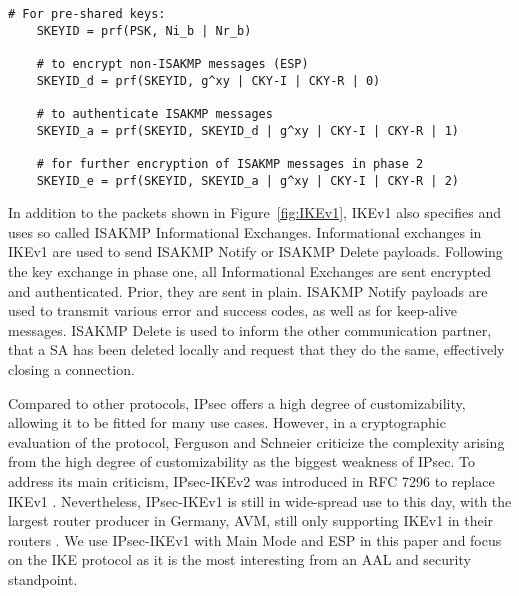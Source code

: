 \begin{lstlisting}[float=ht, caption=IKE Keying, label=lst:keying]
	# For pre-shared keys: 
	SKEYID = prf(PSK, Ni_b | Nr_b)
	
	# to encrypt non-ISAKMP messages (ESP)
	SKEYID_d = prf(SKEYID, g^xy | CKY-I | CKY-R | 0)
	
	# to authenticate ISAKMP messages
	SKEYID_a = prf(SKEYID, SKEYID_d | g^xy | CKY-I | CKY-R | 1)
	
	# for further encryption of ISAKMP messages in phase 2
	SKEYID_e = prf(SKEYID, SKEYID_a | g^xy | CKY-I | CKY-R | 2)
\end{lstlisting}

In addition to the packets shown in Figure~\ref{fig:IKEv1}, IKEv1 also specifies and uses so called ISAKMP Informational Exchanges. Informational exchanges in IKEv1 are used to send ISAKMP Notify or ISAKMP Delete payloads. Following the key exchange in phase one, all Informational Exchanges are sent encrypted and authenticated. Prior, they are sent in plain. ISAKMP Notify payloads are used to transmit various error and success codes, as well as for keep-alive messages. ISAKMP Delete is used to inform the other communication partner, that a SA has been deleted locally and request that they do the same, effectively closing a connection. 

Compared to other protocols, IPsec offers a high degree of customizability, allowing it to be fitted for many use cases. However, in a cryptographic evaluation of the protocol, Ferguson and Schneier \textcite{ferguson1999cryptographic} criticize the complexity arising from the high degree of customizability as the biggest weakness of IPsec. To address its main criticism, IPsec-IKEv2 was introduced in RFC 7296 to replace IKEv1 \parencite{kaufman2014internet}. Nevertheless, IPsec-IKEv1 is still in wide-spread use to this day, with the largest router producer in Germany, AVM, still only supporting IKEv1 in their routers \parencite{avm2022}. We use IPsec-IKEv1 with Main Mode and ESP in this paper and focus on the IKE protocol as it is the most interesting from an AAL and security standpoint. %

